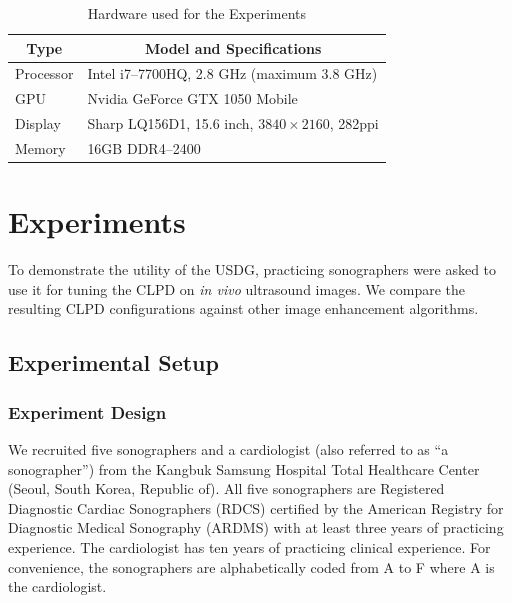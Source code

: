 
\begin{table}
  \centering
  \caption{Hardware used for the Experiments}\label{table:specs}
  \begin{threeparttable}
  \begin{tabular}{ll}
    \toprule
    \multicolumn{1}{c}{\textbf{Type}}
    & \multicolumn{1}{c}{\textbf{Model and Specifications}}
    \\ \midrule
    Processor & Intel i7--7700HQ, 2.8 GHz (maximum 3.8 GHz) \\
    GPU       & Nvidia GeForce GTX 1050 Mobile \\
    Display   & Sharp LQ156D1, 15.6 inch, \(3840 \times 2160\), 282ppi  \\
    Memory    & 16GB DDR4--2400 \\ \bottomrule
  \end{tabular}
  \end{threeparttable}
  \vspace{-0.1in}
\end{table}
%

%

\section{Experiments}\label{section:eval}
To demonstrate the utility of the USDG, practicing sonographers were asked to use it for tuning the CLPD on \textit{in vivo} ultrasound images.
We compare the resulting CLPD configurations against other image enhancement algorithms.


\subsection{Experimental Setup}
\subsubsection{Experiment Design}\label{section:experiment_design}
We recruited five sonographers and a cardiologist (also referred to as ``a sonographer'') from the Kangbuk Samsung Hospital Total Healthcare Center (Seoul, South Korea, Republic of).
All five sonographers are Registered Diagnostic Cardiac Sonographers (RDCS) certified by the American Registry for Diagnostic Medical Sonography (ARDMS) with at least three years of practicing experience.
The cardiologist has ten years of practicing clinical experience.
For convenience, the sonographers are alphabetically coded from A to F where A is the cardiologist.

